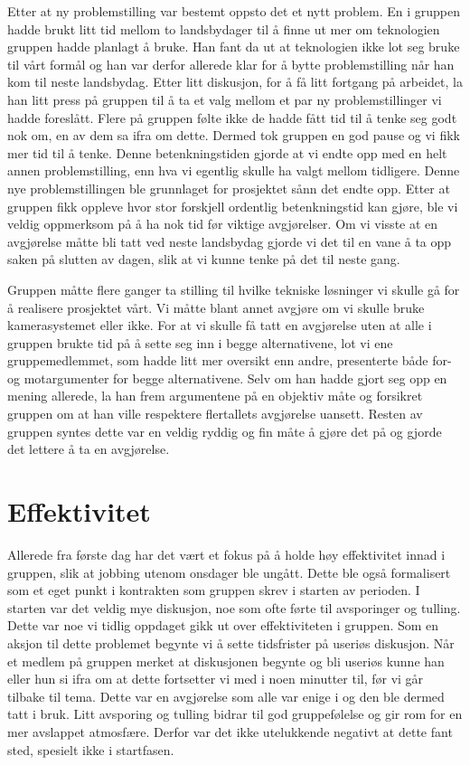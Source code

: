 Etter at ny problemstilling var bestemt oppsto det et nytt problem. En i gruppen hadde brukt litt tid mellom to landsbydager til å finne ut mer om teknologien gruppen hadde planlagt å bruke. Han fant da ut at teknologien ikke lot seg bruke til vårt formål og han var derfor allerede klar for å bytte problemstilling når han kom til neste landsbydag. Etter litt diskusjon, for å få litt fortgang på arbeidet, la han litt press på gruppen til å ta et valg mellom et par ny problemstillinger vi hadde foreslått. Flere på gruppen følte ikke de hadde fått tid til å tenke seg godt nok om, en av dem sa ifra om dette. Dermed tok gruppen en god pause og vi fikk mer tid til å tenke. Denne betenkningstiden gjorde at vi endte opp med en helt annen problemstilling, enn hva vi egentlig skulle ha valgt mellom tidligere. Denne nye problemstillingen ble grunnlaget for prosjektet sånn det endte opp. Etter at gruppen fikk oppleve hvor stor forskjell ordentlig betenkningstid kan gjøre, ble vi veldig oppmerksom på å ha nok tid før viktige avgjørelser. Om vi visste at en avgjørelse måtte bli tatt ved neste landsbydag gjorde vi det til en vane å ta opp saken på slutten av dagen, slik at vi kunne tenke på det til neste gang.

Gruppen måtte flere ganger ta stilling til hvilke tekniske løsninger vi skulle gå for å realisere prosjektet vårt. Vi måtte blant annet avgjøre om vi skulle bruke kamerasystemet eller ikke. For at vi skulle få tatt en avgjørelse uten at alle i gruppen brukte tid på å sette seg inn i begge alternativene, lot vi ene gruppemedlemmet, som hadde litt mer oversikt enn andre, presenterte både for- og motargumenter for begge alternativene. Selv om han hadde gjort seg opp en mening allerede, la han frem argumentene på en objektiv måte og forsikret gruppen om at han ville respektere flertallets avgjørelse uansett. Resten av gruppen syntes dette var en veldig ryddig og fin måte å gjøre det på og gjorde det lettere å ta en avgjørelse.

\section{Effektivitet}

Allerede fra første dag har det vært et fokus på å holde høy effektivitet innad i gruppen, slik at jobbing utenom onsdager ble ungått. Dette ble også formalisert som et eget punkt i kontrakten som gruppen skrev i starten av perioden. I starten var det veldig mye diskusjon, noe som ofte førte til avsporinger og tulling. Dette var noe vi tidlig oppdaget gikk ut over effektiviteten i gruppen. Som en aksjon til dette problemet begynte vi å sette tidsfrister på useriøs diskusjon. Når et medlem på gruppen merket at diskusjonen begynte og bli useriøs kunne han eller hun si ifra om at dette fortsetter vi med i noen minutter til, før vi går tilbake til tema. Dette var en avgjørelse som alle var enige i og den ble dermed tatt i bruk. Litt avsporing og tulling bidrar til god gruppefølelse og gir rom for en mer avslappet atmosfære. Derfor var det ikke utelukkende negativt at dette fant sted, spesielt ikke i startfasen. 

